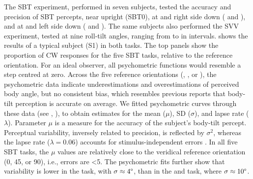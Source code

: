 The SBT experiment, performed in seven subjects, tested the accuracy and precision of SBT percepts, near upright (SBT0), at  and  right side down ( and ), and at  and  left side down ( and ). The same subjects also performed the SVV experiment, tested at nine roll-tilt angles, ranging from  to  in  intervals.  shows the results of a typical subject (S1) in both tasks. The top panels show the proportion of CW responses for the five SBT tasks, relative to the reference orientation. For an ideal observer, all psychometric functions would resemble a step centred at zero. Across the five reference orientations (, , or ), the psychometric data indicate underestimations and overestimations of perceived body angle, but no consistent bias, which resembles previous reports \cite{mittelstaedt1983, mast1996, jarchow1999, vanbeuzekom2001} that body-tilt perception is accurate on average. We fitted psychometric curves through these data (see , ), to obtain estimates for the mean ($\mu$), SD ($\sigma$), and lapse rate ($\lambda$). Parameter $\mu$ is a measure for the accuracy of the subject's body-tilt percept. Perceptual variability, inversely related to precision, is reflected by $\sigma^2$, whereas the lapse rate ($\lambda = 0.06$) accounts for stimulus-independent errors \cite{wichmann2001}. In all five SBT tasks, the $\mu$ values are relatively close to the veridical reference orientation (0\textdegree, 45\textdegree, or 90\textdegree), i.e., errors are \textless5\textdegree. The psychometric fits further show that variability is lower in the  task, with $\sigma \approx 4\degree$, than in the  and  task, where $\sigma \approx 10\degree$. 

